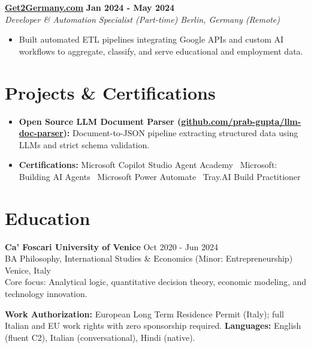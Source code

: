 \documentclass[a4paper,10pt]{article}
\newcommand{\role}[4]{%
 \textbf{#1} \hfill \textbf{#2}\\[1pt]%
 \textit{#3} \hfill \textit{#4}\\[2pt]%
}
\begin{document}
\role{\href{https://get2germany.com}{Get2Germany.com}}{Jan 2024 - May 2024}{Developer \& Automation Specialist (Part-time)}{Berlin, Germany (Remote)}
\begin{itemize}
 \item Built automated ETL pipelines integrating Google APIs and custom AI workflows to aggregate, classify, and serve educational and employment data.
\end{itemize}

\section{Projects \& Certifications}
\begin{itemize}
 \item \textbf{Open Source LLM Document Parser (\href{https://github.com/prab-gupta/llm-doc-parser}{github.com/prab-gupta/llm-doc-parser}):} Document-to-JSON pipeline extracting structured data using LLMs and strict schema validation.
 \item \textbf{Certifications:} Microsoft Copilot Studio Agent Academy \textbullet\ Microsoft: Building AI Agents \textbullet\ Microsoft Power Automate \textbullet\ Tray.AI Build Practitioner
\end{itemize}

\section{Education}
\textbf{Ca' Foscari University of Venice} \hfill Oct 2020 - Jun 2024\\
BA Philosophy, International Studies \& Economics (Minor: Entrepreneurship) \hfill Venice, Italy\\
{\footnotesize Core focus: Analytical logic, quantitative decision theory, economic modeling, and technology innovation.}

\vspace{2pt}
{\small \textbf{Work Authorization:} European Long Term Residence Permit (Italy); full Italian and EU work rights with zero sponsorship required. \quad \textbf{Languages:} English (fluent C2), Italian (conversational), Hindi (native).}
\end{document}
